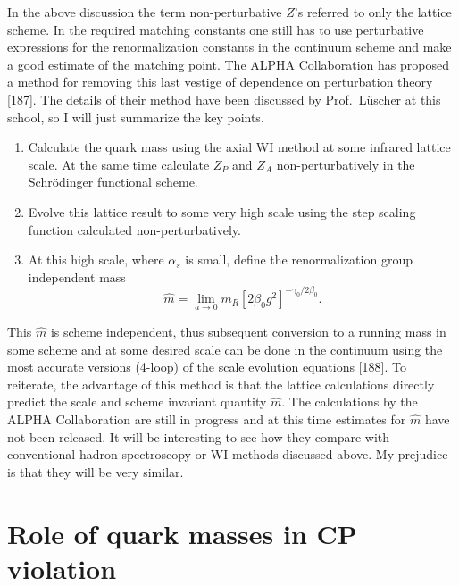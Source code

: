 In the above discussion the term non-perturbative $Z$'s referred to only the lattice scheme. In the required matching constants one still has to use perturbative expressions for the renormalization constants in the continuum scheme and make a good estimate of the matching point. The ALPHA Collaboration has proposed a method for removing this last vestige of dependence on perturbation theory [187]. The details of their method have been discussed by Prof.~L\"uscher at this school, so I will just summarize the key points.
\begin{enumerate}
\item[(i)] Calculate the quark mass using the axial WI method at some infrared lattice scale. At the same time calculate $Z_P$ and $Z_A$ non-perturbatively in the Schr\"odinger functional scheme.
\item[(ii)] Evolve this lattice result to some very high scale using the step scaling function calculated non-perturbatively.
\item[(iii)] At this high scale, where $\alpha_s$ is small, define the renormalization group independent mass
\begin{equation}
\hat{m} = \lim_{a\to 0} m_R \left[2\beta_0 g^2\right]^{-\gamma_0/2\beta_0}.
\end{equation}
\end{enumerate}
This $\hat{m}$ is scheme independent, thus subsequent conversion to a running mass in some scheme and at some desired scale can be done in the continuum using the most accurate versions (4-loop) of the scale evolution equations [188]. To reiterate, the advantage of this method is that the lattice calculations directly predict the scale and scheme invariant quantity $\hat{m}$. The calculations by the ALPHA Collaboration are still in progress and at this time estimates for $\hat{m}$ have not been released. It will be interesting to see how they compare with conventional hadron spectroscopy or WI methods discussed above. My prejudice is that they will be very similar.

\section{Role of quark masses in CP violation}

